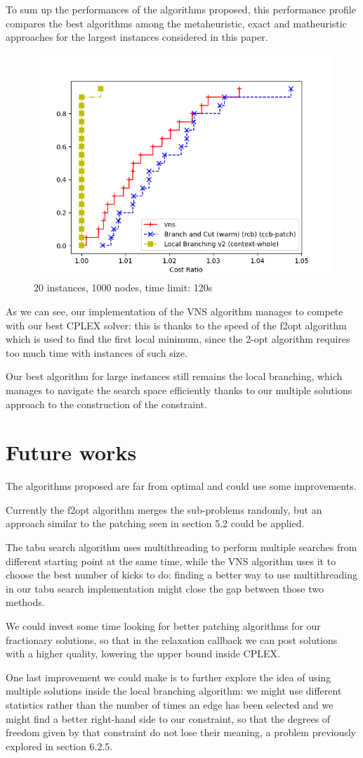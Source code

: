 To sum up the performances of the algorithms proposed, this performance profile compares the best algorithms among the metaheuristic, exact and matheuristic approaches for the largest instances considered in this paper.

\begin{figure}[h]
    \centering
    \includegraphics*[width=.6\textwidth]{../plots/perfprof_conclusions.png}
    \caption*{20 instances, 1000 nodes, time limit: 120s}
\end{figure}

As we can see, our implementation of the VNS algorithm manages to compete with our best CPLEX solver: this is thanks to the speed of the f2opt algorithm which is used to find the first local minimum, since the 2-opt algorithm requires too much time with instances of such size.

Our best algorithm for large instances still remains the local branching, which manages to navigate the search space efficiently thanks to our multiple solutions approach to the construction of the constraint.

\newpage

\section{Future works}
The algorithms proposed are far from optimal and could use some improvements.

Currently the f2opt algorithm merges the sub-problems randomly, but an approach similar to the patching seen in section 5.2 could be applied.

The tabu search algorithm uses multithreading to perform multiple searches from different starting point at the same time, while the VNS algorithm uses it to choose the best number of kicks to do: finding a better way to use multithreading in our tabu search implementation might close the gap between those two methods.

We could invest some time looking for better patching algorithms for our fractionary solutions, so that in the relaxation callback we can post solutions with a higher quality, lowering the upper bound inside CPLEX.

One last improvement we could make is to further explore the idea of using multiple solutions inside the local branching algorithm: we might use different statistics rather than the number of times an edge has been selected and we might find a better right-hand side to our constraint, so that the degrees of freedom given by that constraint do not lose their meaning, a problem previously explored in section 6.2.5.
